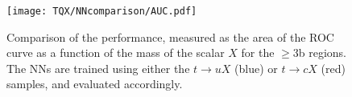 \begin{figure}[htb]
    \RawFloats
    \centering
    \texttt{[image: TQX/NNcomparison/AUC.pdf]}

    \caption{Comparison of the performance, measured as the area of the ROC curve as a function of the mass of the scalar $X$ for the $\ge$3b regions. The NNs are trained using either the $t\to uX$ (blue) or $t\to cX$ (red) samples, and evaluated accordingly.
    }
    \label{tqX:NNAUC}
\end{figure}

\clearpage